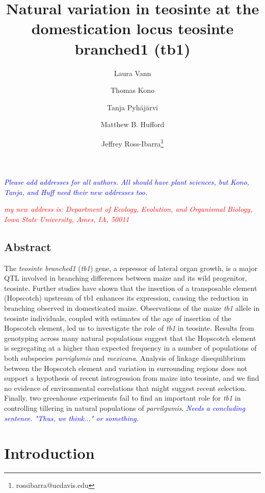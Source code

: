 \documentclass[12pt]{article}
\title{Natural variation in teosinte at the domestication locus teosinte branched1 (tb1)}
\author[1]{Laura Vann}
\author[1]{Thomas Kono}
\author[1]{Tanja Pyh\"aj\"arvi}
\author[1]{Matthew B. Hufford}
\author[1,2]{Jeffrey Ross-Ibarra\thanks{rossibarra@ucdavis.edu}}
\affil[1]{Department of Plant Sciences, University of California Davis}
\affil[2]{Center for Population Biology and Genome Center, University of California Davis}
\newcommand{\jri}[1]{\textcolor{blue}{ \emph{\scriptsize  #1}} }
\newcommand{\mbh}[1]{\textcolor{red}{ \emph{\scriptsize  #1}} }
\begin{document}
\maketitle

\jri{Please add addresses for all authors.  All should have plant sciences, but Kono, Tanja, and Huff need their new addresses too. }

\mbh{my new address is: Department of Ecology, Evolution, and Organismal Biology, Iowa State University, Ames, IA, 50011}

\clearpage

\subsection*{Abstract}

The \emph{teosinte branched1} (\emph{tb1}) gene, a repressor of lateral organ growth, is a major QTL involved in branching differences between maize and its wild progenitor, teosinte. Further studies have shown that the insertion of a transposable element (Hopscotch) upstream of tb1 enhances its expression, causing the reduction in branching observed in domesticated maize. Observations of the maize \emph{tb1} allele in teosinte individuals, coupled with estimates of the age of insertion of the Hopscotch element, led us to investigate the role of \emph{tb1} in teosinte. Results from genotyping across many natural populations suggest that the Hopscotch element is segregating at a higher than expected frequency in a number of populations of both subspecies \emph{parviglumis} and \emph{mexicana}. Analysis of linkage disequilibrium between the Hopscotch element and variation in surrounding regions does not support a hypothesis of recent introgression from maize into teosinte, and we find no evidence of environmental correlations that might suggest recent selection.  Finally, two greenhouse experiments fail to find an important role for \emph{tb1} in controlling tillering in natural populations of \emph{parvilgumis}. \jri{Needs a concluding sentence. "Thus, we think..." or something.} 

\clearpage

\section*{Introduction}
\end{document}

